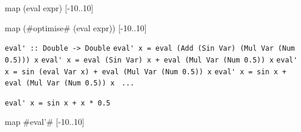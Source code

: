 \documentclass{beamer}
\begin{document}
\begin{frame}[fragile]

\begin{codeEx}
map (eval expr) [-10..10]
\end{codeEx}

\end{frame}

\begin{frame}[fragile] 
\begin{codeExDiff}
map (#optimise# (eval expr)) [-10..10]
\end{codeExDiff}

\pause

\verb|eval' :: Double -> Double|
\pause
\verb|eval' x = eval (Add (Sin Var) (Mul Var (Num 0.5))) x|
\pause
\verb|eval' x = eval (Sin Var) x + eval (Mul Var (Num 0.5)) x|
\pause
\verb|eval' x = sin (eval Var x) + eval (Mul Var (Num 0.5)) x|
\pause
\verb|eval' x = sin x + eval (Mul Var (Num 0.5)) x |
\pause
\verb|...                          |

\verb|eval' x = sin x + x * 0.5|

\pause

\begin{codeExDiff}
map #eval'# [-10..10]
\end{codeExDiff}
\end{frame}



\end{document}
